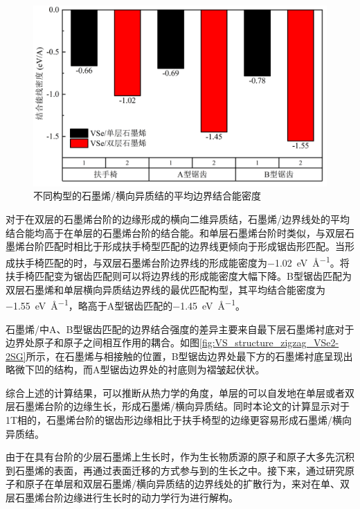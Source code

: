     \begin{figure}[htb]
        \includegraphics{pic/VS_DFT_VSe2-G_stepAndEdge.png}
        \caption{不同构型的石墨烯/横向异质结的平均边界结合能密度}
        \label{fig:VS_DFT_VSe2-G_stepAndEdge}
    \end{figure}

    对于在双层的石墨烯台阶的边缘形成的横向二维异质结，石墨烯/边界线处的平均结合能均高于在单层的石墨烯台阶的结合能。和单层石墨烯台阶时类似，与双层石墨烯台阶匹配时相比于形成扶手椅型匹配的边界线更倾向于形成锯齿形匹配。当形成扶手椅匹配的时，与双层石墨烯台阶边界线的形成能密度为\SI{-1.02}{\electronvolt\per\angstrom}。将扶手椅匹配变为锯齿匹配则可以将边界线的形成能密度大幅下降。B型锯齿匹配为双层石墨烯和单层横向异质结边界线的最优匹配构型，其平均结合能密度为\SI{-1.55}{\electronvolt\per\angstrom}，略高于A型锯齿匹配的\SI{-1.45}{\electronvolt\per\angstrom}。

    石墨烯/中A、B型锯齿匹配的边界结合强度的差异主要来自最下层石墨烯衬底对于边界处原子和原子之间相互作用的耦合。如图\ref{fig:VS_structure_zigzag_VSe2-2SG}所示，在石墨烯与相接触的位置，B型锯齿边界处最下方的石墨烯衬底呈现出略微下凹的结构，而A型锯齿边界处的衬底则为褶皱起伏状。

    综合上述的计算结果，可以推断从热力学的角度，单层的可以自发地在单层或者双层石墨烯台阶的边缘生长，形成石墨烯/横向异质结。同时本论文的计算显示对于1T相的，石墨烯台阶的锯齿形边缘相比于扶手椅型的边缘更容易形成石墨烯/横向异质结。

    由于在具有台阶的少层石墨烯上生长时，作为生长物质源的原子和原子大多先沉积到石墨烯的表面，再通过表面迁移的方式参与到的生长之中。接下来，通过研究原子和原子在单层和双层石墨烯/横向异质结的边界线处的扩散行为，来对在单、双层石墨烯台阶边缘进行生长时的动力学行为进行解构。


